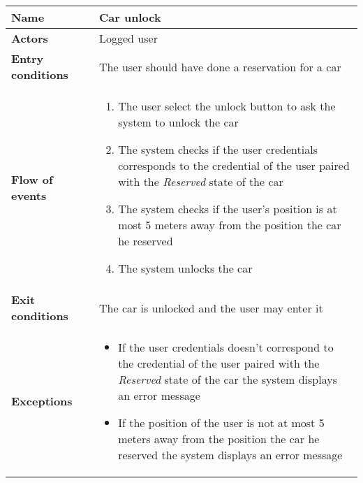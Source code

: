 \begin{tabular}{p{0.25\linewidth}p{0.75\linewidth}}
\toprule
\textbf{Name} & \textbf{Car unlock} \\
\midrule
\textbf{Actors} &  Logged user \\
\midrule
\textbf{Entry conditions} & The user should have done a reservation for a car \\
\midrule
\textbf{Flow of events} & 
\begin{enumerate}
	\item The user select the unlock button to ask the system to unlock the car
	\item The system checks if the user credentials corresponds to the credential of the user paired with the \emph{Reserved} state of the car
	\item The system checks if the user's position is at most 5 meters away from the position the car he reserved
	\item The system unlocks the car
\end{enumerate} \\
\midrule
\textbf{Exit conditions} & The car is unlocked and the user may enter it\\
\midrule
\textbf{Exceptions} & 
\begin{itemize}
	\item If the user credentials doesn't correspond to the credential of the user paired with the \emph{Reserved} state of the car the system displays an error message
	\item If the position of the user is not at most 5 meters away from the position the car he reserved the system displays an error message
\end{itemize} \\
\bottomrule
\end{tabular}

